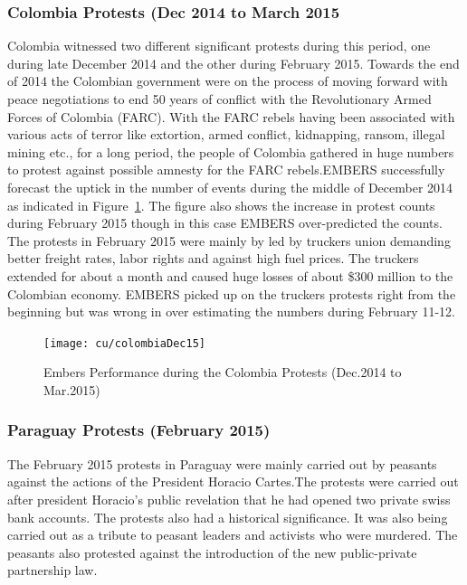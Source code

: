 \subsubsection*{Colombia Protests (Dec 2014 to March 2015}
Colombia witnessed two different significant protests during this period, one during late December 2014
and the other during February 2015. Towards the end of 2014 the Colombian government were on the process
of moving forward with peace negotiations to end 50 years of conflict with the Revolutionary Armed Forces
of Colombia (FARC). With the FARC rebels having been associated with various acts of terror like extortion, armed conflict,
kidnapping, ransom, illegal mining etc., for a long period, the people of Colombia gathered in huge numbers
 to protest against possible amnesty for the FARC rebels.EMBERS successfully forecast the uptick in the number of events during the
middle of December 2014 as indicated in Figure~\ref{fig:colombiaDec14}. The figure also shows the increase in protest counts
during February 2015 though in this case EMBERS over-predicted the counts. The protests in February 2015
were mainly by led by truckers union demanding better freight rates, labor rights and against high fuel prices.
The truckers extended for about a month and caused huge losses of about \$300
million to the Colombian economy.
EMBERS picked up on the truckers protests right from the beginning but was wrong in over estimating the numbers during
February 11-12.

\begin{figure}[H]
\centering
\texttt{[image: cu/colombiaDec15]}
\caption{Embers Performance during the Colombia Protests (Dec.2014 to Mar.2015)}
\label{fig:colombiaDec14}
\end{figure}

\subsubsection*{Paraguay Protests (February 2015)}
The February 2015 protests in Paraguay were mainly carried out by peasants
against the actions of the President Horacio Cartes.The protests were carried out after
president Horacio's public revelation that he had opened two private swiss bank accounts.
The protests also had a historical significance. It was also being carried out as a tribute
to peasant leaders and activists who were murdered. The peasants also protested
against the introduction of the new public-private partnership law.

